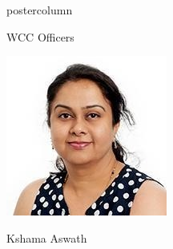\documentclass{beamer}
\begin{document}
\begin{frame}
\begin{columns}
\begin{column}{.33\textwidth}
\begin{beamercolorbox}[center,wd=\textwidth]{postercolumn}
\begin{minipage}[T]{.95\textwidth}
{\begin{myblock}{WCC Officers}
\begin{addmargin}[1em]{1em}
\begin{minipage}{0.3\linewidth}
                            \end{minipage}
                            \hspace{0.1cm}
                            \begin{minipage}{0.3\linewidth}
                                \includegraphics[width=\linewidth]{img/kshama.jpg}
                                \centerline{Kshama Aswath}
                            \end{minipage}
                            \hspace{0.1cm}
                            \begin{minipage}{0.3\linewidth}

\end{minipage}
\end{addmargin}
\end{myblock}}
\end{minipage}
\end{beamercolorbox}
\end{column}
\end{columns}
\end{frame}
\end{document}
